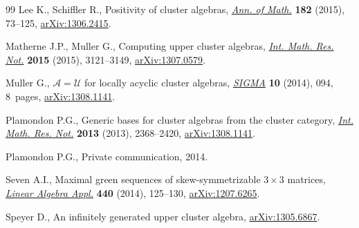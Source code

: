 \documentclass[pdftex]{sigma}
\numberwithin{equation}{section}
\begin{document}
\begin{thebibliography}{99}
Lee K., Schif\/f\/ler R., Positivity of cluster algebras, \href{http://dx.doi.org/10.4007/annals.2015.182.1.2}{\textit{Ann. of Math.}}
  \textbf{182} (2015), 73--125, \href{http://arxiv.org/abs/1306.2415}{arXiv:1306.2415}.

Matherne J.P., Muller G., Computing upper cluster algebras, \href{http://dx.doi.org/10.1093/imrn/rnu027}{\textit{Int. Math.
  Res. Not.}} \textbf{2015} (2015), 3121--3149, \href{http://arxiv.org/abs/1307.0579}{arXiv:1307.0579}.

Muller G., {${\mathcal A}={\mathcal U}$} for locally acyclic cluster algebras,
  \href{http://dx.doi.org/10.3842/SIGMA.2014.094}{\textit{SIGMA}} \textbf{10} (2014), 094, 8~pages, \href{http://arxiv.org/abs/1308.1141}{arXiv:1308.1141}.


Plamondon P.G., Generic bases for cluster algebras from the cluster category,
  \href{http://dx.doi.org/10.1093/imrn/rns102}{\textit{Int. Math. Res. Not.}} \textbf{2013} (2013), 2368--2420,
  \href{http://arxiv.org/abs/1308.1141}{arXiv:1308.1141}.

Plamondon P.G., {P}rivate communication, 2014.

Seven A.I., Maximal green sequences of skew-symmetrizable {$3\times3$}
  matrices, \href{http://dx.doi.org/10.1016/j.laa.2013.10.018}{\textit{Linear Algebra Appl.}} \textbf{440} (2014), 125--130,
  \href{http://arxiv.org/abs/1207.6265}{arXiv:1207.6265}.

Speyer D., An inf\/initely generated upper cluster algebra, \href{http://arxiv.org/abs/1305.6867}{arXiv:1305.6867}.

\end{thebibliography}\LastPageEnding
\end{document}
